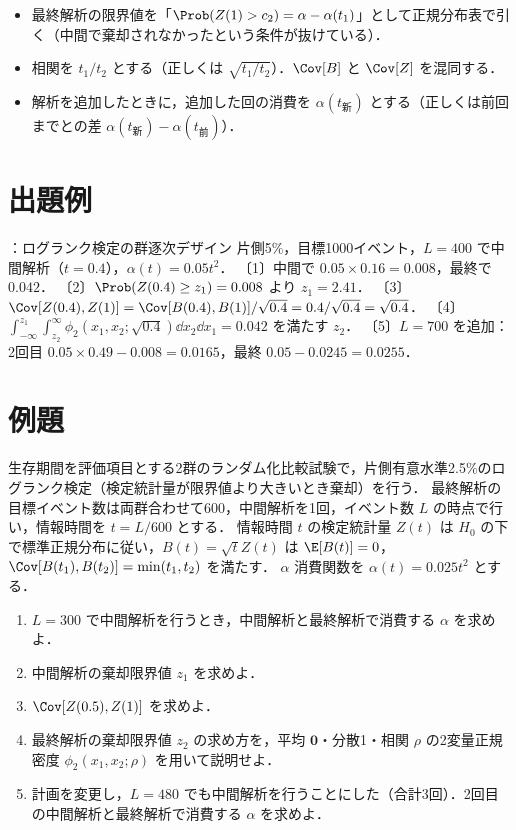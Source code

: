\begin{warnbox}
\begin{itemize}
\item 最終解析の限界値を「$\Prob(Z(1)>c_2)=\alpha-\alpha(t_1)$」として正規分布表で引く（中間で棄却されなかったという条件が抜けている）．
\item 相関を $t_1/t_2$ とする（正しくは $\sqrt{t_1/t_2}$）．$\Cov[B]$ と $\Cov[Z]$ を混同する．
\item 解析を追加したときに，追加した回の消費を $\alpha(t_{\text{新}})$ とする（正しくは前回までとの差 $\alpha(t_{\text{新}})-\alpha(t_{\text{前}})$）．
\end{itemize}
\end{warnbox}

\section{出題例}\label{sec:m09-shutsudai}
\begin{shutsudai}{：ログランク検定の群逐次デザイン}
片側5\%，目標1000イベント，$L=400$ で中間解析（$t=0.4$），$\alpha(t)=0.05t^2$．
〔1〕中間で $0.05\times0.16=0.008$，最終で $0.042$．
〔2〕$\Prob(Z(0.4)\ge z_1)=0.008$ より $z_1=2.41$．
〔3〕$\Cov[Z(0.4),Z(1)]=\Cov[B(0.4),B(1)]/\sqrt{0.4}=0.4/\sqrt{0.4}=\sqrt{0.4}$．
〔4〕$\int_{-\infty}^{z_1}\int_{z_2}^{\infty}\phi_2(x_1,x_2;\sqrt{0.4})\dd x_2\dd x_1=0.042$ を満たす $z_2$．
〔5〕$L=700$ を追加：2回目 $0.05\times0.49-0.008=0.0165$，最終 $0.05-0.0245=0.0255$．
\end{shutsudai}

\section{例題}\label{sec:m09-reidai}
\begin{reidai}\label{reidai:m09-1}
生存期間を評価項目とする2群のランダム化比較試験で，片側有意水準2.5\%のログランク検定（検定統計量が限界値より大きいとき棄却）を行う．
最終解析の目標イベント数は両群合わせて600，中間解析を1回，イベント数 $L$ の時点で行い，情報時間を $t=L/600$ とする．
情報時間 $t$ の検定統計量 $Z(t)$ は $H_0$ の下で標準正規分布に従い，$B(t)=\sqrt tZ(t)$ は $\E[B(t)]=0$，$\Cov[B(t_1),B(t_2)]=\min(t_1,t_2)$ を満たす．
$\alpha$ 消費関数を $\alpha(t)=0.025t^2$ とする．
\begin{enumerate}[label=〔\arabic*〕]
\item $L=300$ で中間解析を行うとき，中間解析と最終解析で消費する $\alpha$ を求めよ．
\item 中間解析の棄却限界値 $z_1$ を求めよ．
\item $\Cov[Z(0.5),Z(1)]$ を求めよ．
\item 最終解析の棄却限界値 $z_2$ の求め方を，平均 $\bm 0$・分散1・相関 $\rho$ の2変量正規密度 $\phi_2(x_1,x_2;\rho)$ を用いて説明せよ．
\item 計画を変更し，$L=480$ でも中間解析を行うことにした（合計3回）．2回目の中間解析と最終解析で消費する $\alpha$ を求めよ．
\end{enumerate}
\end{reidai}

